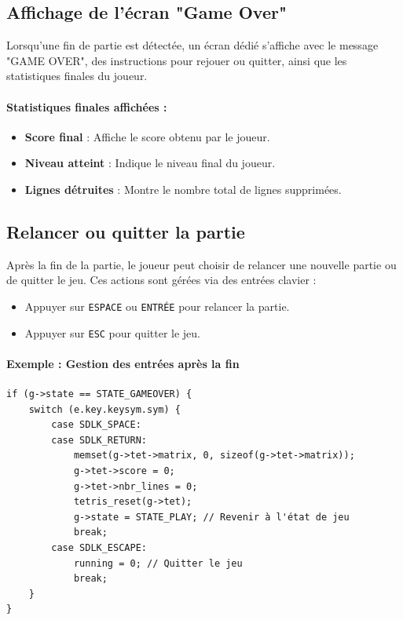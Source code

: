 \documentclass[12pt,a4paper]{report}
\begin{document}
\subsection{Affichage de l'écran "Game Over"}
Lorsqu’une fin de partie est détectée, un écran dédié s’affiche avec le message "GAME OVER", des instructions pour rejouer ou quitter, ainsi que les statistiques finales du joueur.

\paragraph{Statistiques finales affichées :}
\begin{itemize}
    \item \textbf{Score final} : Affiche le score obtenu par le joueur.
    \item \textbf{Niveau atteint} : Indique le niveau final du joueur.
    \item \textbf{Lignes détruites} : Montre le nombre total de lignes supprimées.
\end{itemize}

\subsection{Relancer ou quitter la partie}
Après la fin de la partie, le joueur peut choisir de relancer une nouvelle partie ou de quitter le jeu. Ces actions sont gérées via des entrées clavier :
\begin{itemize}
    \item Appuyer sur \texttt{ESPACE} ou \texttt{ENTRÉE} pour relancer la partie.
    \item Appuyer sur \texttt{ESC} pour quitter le jeu.
\end{itemize}

\paragraph{Exemple : Gestion des entrées après la fin}
\begin{lstlisting}
if (g->state == STATE_GAMEOVER) {
    switch (e.key.keysym.sym) {
        case SDLK_SPACE:
        case SDLK_RETURN:
            memset(g->tet->matrix, 0, sizeof(g->tet->matrix));
            g->tet->score = 0;
            g->tet->nbr_lines = 0;
            tetris_reset(g->tet);
            g->state = STATE_PLAY; // Revenir à l'état de jeu
            break;
        case SDLK_ESCAPE:
            running = 0; // Quitter le jeu
            break;
    }
}
\end{lstlisting}
\end{document}
